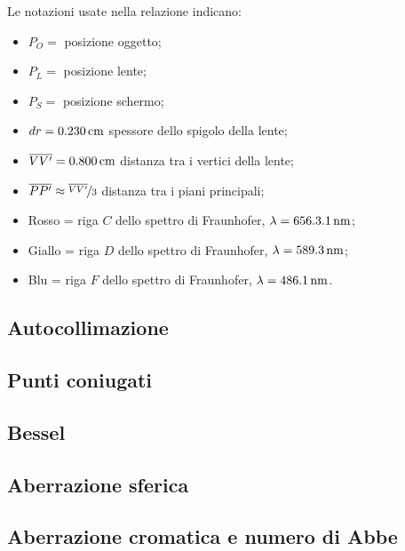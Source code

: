Le notazioni usate nella relazione indicano:
\begin{itemize}
\item $P_O =$ posizione oggetto;
\item $P_L =$ posizione lente;
\item $P_S =$ posizione schermo;
\item $dr = 0.230 \,\mathrm{cm}$ spessore dello spigolo della lente;
\item $\overline{VV'} = 0.800 \,\mathrm{cm}$ distanza tra i vertici della lente;
\item $\overline{PP'} \approx \nicefrac{\overline{VV'}}{3}$ distanza tra i piani principali;
\item Rosso = riga $C$ dello spettro di Fraunhofer, $\lambda = 656.3.1 \,\mathrm{nm}$;
\item Giallo = riga $D$ dello spettro di Fraunhofer, $\lambda = 589.3 \,\mathrm{nm}$;
\item Blu = riga $F$ dello spettro di Fraunhofer, $\lambda = 486.1 \,\mathrm{nm}$.
\end{itemize}
\FloatBarrier
\subsection{Autocollimazione}
\label{subsec:autocollimazione}

\FloatBarrier
\subsection{Punti coniugati}

\FloatBarrier
\subsection{Bessel}

\FloatBarrier
\subsection{Aberrazione sferica}
\label{subsec:aberrazione_sferica}

\FloatBarrier
\subsection{Aberrazione cromatica e numero di Abbe}

